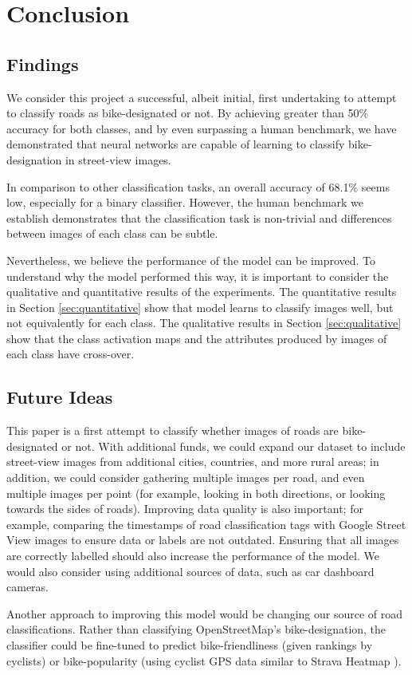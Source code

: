 \documentclass[10pt,twocolumn,letterpaper]{article}
\begin{document}
\section{Conclusion}
\label{sec:conclusion}

\subsection{Findings}

We consider this project a successful, albeit initial, first undertaking to attempt to classify roads as bike-designated or not. By achieving greater than 50\% accuracy for both classes, and by even surpassing a human benchmark, we have demonstrated that neural networks are capable of learning to classify bike-designation in street-view images. 

In comparison to other classification tasks, an overall accuracy of 68.1\% seems low, especially for a binary classifier. However, the human benchmark we establish demonstrates that the classification task is non-trivial and differences between images of each class can be subtle.  

Nevertheless, we believe the performance of the model can be improved. To understand why the model performed this way, it is important to consider the qualitative and quantitative results of the experiments. The quantitative results in Section \ref{sec:quantitative} show that model learns to classify images well, but not equivalently for each class. The qualitative results in Section \ref{sec:qualitative} show that the class activation maps and the attributes produced by images of each class have cross-over. 

\subsection{Future Ideas}
This paper is a first attempt to classify whether images of roads are bike-designated or not. With additional funds, we could expand our dataset to include street-view images from additional cities, countries, and more rural areas; in addition, we could consider gathering multiple images per road, and even multiple images per point (for example, looking in both directions, or looking towards the sides of roads). Improving data quality is also important; for example, comparing the timestamps of road classification tags with Google Street View images to ensure data or labels are not outdated. Ensuring that all images are correctly labelled should also increase the performance of the model. We would also consider using additional sources of data, such as car dashboard cameras.

Another approach to improving this model would be changing our source of road classifications. Rather than classifying OpenStreetMap's bike-designation, the classifier could be fine-tuned to predict bike-friendliness (given rankings by cyclists) or bike-popularity (using cyclist GPS data similar to Strava Heatmap \cite{strava}). 


\nocite{patterson2014sun, DBLP:journals/corr/ZhouKLOT14, rundle2011using,Wang15l, DBLP:journals/corr/ZagoruykoK16,koehrsen2018blog}

{\small


}
\end{document}
